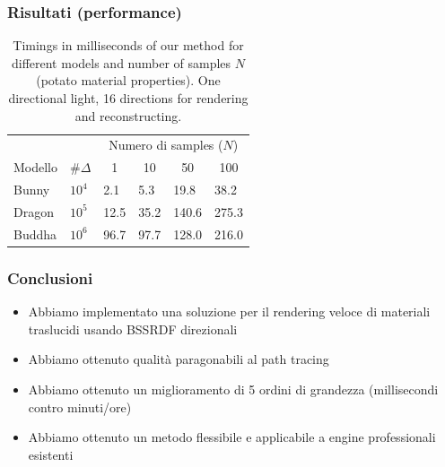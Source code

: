 \documentclass{beamer}
\newcommand\mycolor[1]{#1}
\begin{document}
\begin{frame}
    \frametitle{Risultati (performance)}
\renewcommand{\arraystretch}{1.8}
\begin{table}[!ht]
\centering
\begin{tabular}{p{3cm}l|l|l|l|l|}
\cline{3-6}
                             &      & \multicolumn{4}{c|}{Numero di samples ($N$)}                                          \\ \cline{3-6} 
Modello                        & \#$\Delta$& \multicolumn{1}{c|}{1} & \multicolumn{1}{c|}{10} & \multicolumn{1}{c|}{50} & \multicolumn{1}{c|}{100} \\ \hline
\multicolumn{1}{|l|}{Bunny}  & $10^4$ & \mycolor{2}.1                  & \mycolor{5}.3                 & \mycolor{19}.8                  & \mycolor{38}.2                 \\ \hline
\multicolumn{1}{|l|}{Dragon} & $10^5$ & \mycolor{12}.5                 & \mycolor{35}.2                  & \mycolor{140}.6                & \mycolor{275}.3                \\ \hline
\multicolumn{1}{|l|}{Buddha} & $10^6$ & \mycolor{96}.7                 & \mycolor{97}.7                  & \mycolor{128}.0                & \mycolor{216}.0                 \\ \hline
\end{tabular}
\caption{Timings in milliseconds of our method for different models and number of samples $N$ (potato material properties). One directional light, 16 directions for rendering and reconstructing.}
\end{table}
\end{frame}

\begin{frame}
    \frametitle{Conclusioni}

\begin{itemize}
	\item Abbiamo implementato una soluzione per il rendering veloce di materiali traslucidi usando BSSRDF direzionali
	\item Abbiamo ottenuto qualità paragonabili al path tracing
	\item Abbiamo ottenuto un miglioramento di 5 ordini di grandezza (millisecondi contro minuti/ore) 
	\item Abbiamo ottenuto un metodo flessibile e applicabile a engine professionali esistenti
\end{itemize}

\end{frame}
\end{document}
